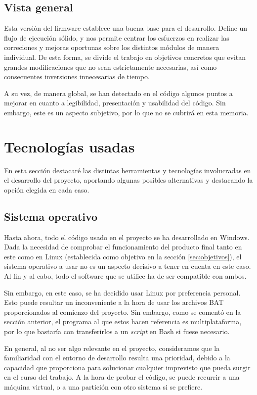 \subsection{Vista general}

Esta versión del firmware establece una buena base para el desarrollo. Define un flujo de ejecución sólido, y nos permite centrar los esfuerzos en realizar las correciones y mejoras oportunas sobre los distintos módulos de manera individual. De esta forma, se divide el trabajo en objetivos concretos que evitan grandes modificaciones que no sean estrictamente necesarias, así como consecuentes inversiones innecesarias de tiempo.

A su vez, de manera global, se han detectado en el código algunos puntos a mejorar en cuanto a legibilidad, presentación y usabilidad del código. Sin embargo, este es un aspecto subjetivo, por lo que no se cubrirá en esta memoria.

\section{Tecnologías usadas}

En esta sección destacaré las distintas herramientas y tecnologías involucradas en el desarrollo del proyecto, aportando algunas posibles alternativas y destacando la opción elegida en cada caso.

\subsection{Sistema operativo}

Hasta ahora, todo el código usado en el proyecto se ha desarrollado en Windows. Dada la necesidad de comprobar el funcionamiento del producto final tanto en este como en Linux (establecida como objetivo en la sección \ref{sec:objetivos}), el sistema operativo a usar no es un aspecto decisivo a tener en cuenta en este caso. Al fin y al cabo, todo el software que se utilice ha de ser compatible con ambos.

Sin embargo, en este caso, se ha decidido usar Linux por preferencia personal. Esto puede resultar un inconveniente a la hora de usar los archivos BAT proporcionados al comienzo del proyecto. Sin embargo, como se comentó en la sección anterior, el programa al que estos hacen referencia es multiplataforma, por lo que bastaría con transferirlos a un \textit{script} en Bash si fuese necesario.

En general, al no ser algo relevante en el proyecto, consideramos que la familiaridad con el entorno de desarrollo resulta una prioridad, debido a la capacidad que proporciona para solucionar cualquier imprevisto que pueda surgir en el curso del trabajo. A la hora de probar el código, se puede recurrir a una máquina virtual, o a una partición con otro sistema si se prefiere.

